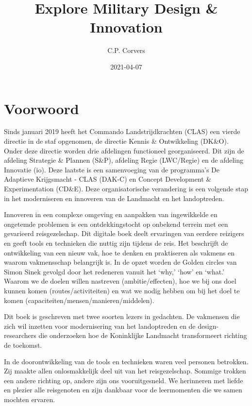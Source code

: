 \documentclass[
]{book}
\title{Explore Military Design \& Innovation}
\author{C.P. Corvers}
\date{2021-04-07}
\begin{document}
\maketitle

{
\setcounter{tocdepth}{1}
\tableofcontents
}
\hypertarget{voorwoord}{%
\chapter*{Voorwoord}\label{voorwoord}}

Sinds januari 2019 heeft het Commando Landstrijdkrachten (CLAS) een vierde directie in de staf opgenomen, de directie Kennis \& Ontwikkeling (DK\&O). Onder deze directie worden drie afdelingen functioneel georganiseerd. Dit zijn de afdeling Strategie \& Plannen (S\&P), afdeling Regie (LWC/Regie) en de afdeling Innovatie (io). Deze laatste is een samenvoeging van de programma's De Adaptieve Krijgsmacht - CLAS (DAK-C) en Concept Development \& Experimentation (CD\&E). Deze organisatorische verandering is een volgende stap in het moderniseren en innoveren van de Landmacht en het landoptreden.

Innoveren in een complexe omgeving en aanpakken van ingewikkelde en ongetemde problemen is een ontdekkingstocht op onbekend terrein met een gevarieerd reisgezelschap. Dit digitale boek deelt ervaringen van eerdere reizigers en geeft tools en technieken die nuttig zijn tijdens de reis. Het beschrijft de ontwikkeling van een nieuw vak, hoe te denken en praktiseren als vakmens en waarom vakmensschap belangrijk is. In de opzet worden de Golden circles van Simon Sinek gevolgd door het redeneren vanuit het `why,' `how' en `what.' Waarom we de doelen willen nastreven (ambitie/effecten), hoe we bij ons doel kunnen komen (routes/activiteiten) en wat we nodig hebben om bij het doel te komen (capaciteiten/mensen/manieren/middelen).

Dit boek is geschreven met twee soorten lezers in gedachten. De vakmensen die zich wil inzetten voor modernisering van het landoptreden en de design-researchers die onderzoeken hoe de Koninklijke Landmacht transformeert richting de toekomst.

In de doorontwikkeling van de tools en technieken waren veel personen betrokken. Zij maakte allen onlosmakkelijk deel uit van het reisgezelschap. Sommige trokken een andere richting op, andere zijn ons vooruitgesneld. We herinneren met liefde en plezier alle reisgenoten en zijn dankbaar voor de leermomenten die we samen mochten ervaren.
\end{document}

